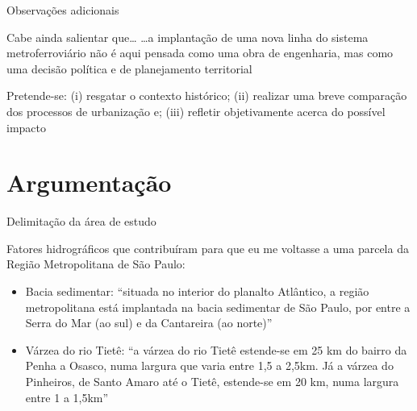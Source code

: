 \documentclass[spectratio=43, portuguese]{beamer}
\begin{document}
\begin{frame}{Observações adicionais}

	\begin{alertblock}{Cabe ainda salientar que\dots}
		\dots {\huge a implantação de uma nova linha do sistema metroferroviário não é aqui pensada como uma obra de engenharia, mas como uma decisão política e de planejamento territorial}
	\end{alertblock}
	
	Pretende-se: (i) resgatar o contexto histórico; (ii) realizar uma breve comparação dos processos de urbanização e; (iii) refletir objetivamente acerca do possível impacto

\end{frame}


\section{Argumentação}


\begin{frame}{Delimitação da área de estudo}
	
	Fatores hidrográficos que contribuíram para que eu me voltasse a uma parcela da Região Metropolitana de São Paulo:
	
	\begin{itemize}
		\item Bacia sedimentar: ``situada no interior do planalto Atlântico, a região metropolitana está implantada na bacia sedimentar de São Paulo, por entre a Serra do Mar (ao sul) e da Cantareira (ao norte)'' \cite[p. 35]{monteiro2010a}
		\item Várzea do rio Tietê: ``a várzea do rio Tietê estende-se em 25 km do bairro da Penha a Osasco, numa largura que varia entre 1,5 a 2,5km. Já a várzea do Pinheiros, de Santo Amaro até o Tietê, estende-se em 20 km, numa largura entre 1 a 1,5km'' \cite[p. 35]{monteiro2010a}
	\end{itemize}
	
\end{frame}

\end{document}
